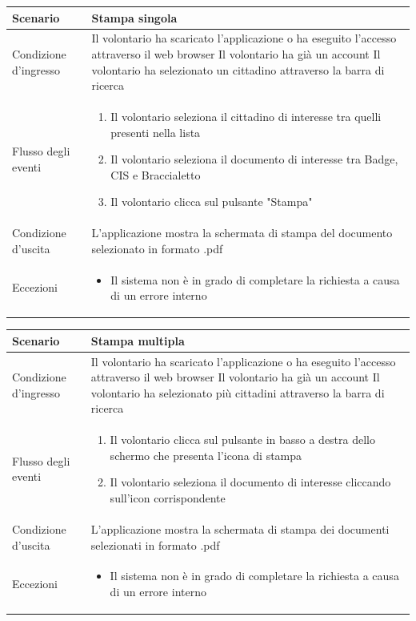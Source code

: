 \documentclass[12pt,a4paper,twoside,openright,titlepage]{book}
\begin{document}
\begin{table}[H]
\centering
\begin{tabular}{|p{4cm}|p{10cm}|}
\hline
Scenario & Stampa singola \\
\hline
Condizione d'ingresso & Il volontario ha scaricato l'applicazione o ha eseguito l'accesso attraverso il web browser \newline
Il volontario ha già un account\newline
Il volontario ha selezionato un cittadino attraverso la barra di ricerca \\
\hline
Flusso degli eventi & 
\begin{enumerate}
\item Il volontario seleziona il cittadino di interesse tra quelli presenti nella lista
\item Il volontario seleziona il documento di interesse tra Badge, CIS e Braccialetto
\item Il volontario clicca sul pulsante "Stampa"
\end{enumerate}\\
\hline
Condizione d'uscita & L'applicazione mostra la schermata di stampa del documento selezionato in formato .pdf\\
\hline
Eccezioni & 
\begin{itemize}
\item Il sistema non è in grado di completare la richiesta a causa di un errore interno
\end{itemize} \\
\hline
\end{tabular}
\end{table}

\begin{table}[H]
\centering
\begin{tabular}{|p{4cm}|p{10cm}|}
\hline
Scenario & Stampa multipla \\
\hline
Condizione d'ingresso & Il volontario ha scaricato l'applicazione o ha eseguito l'accesso attraverso il web browser \newline
Il volontario ha già un account\newline
Il volontario ha selezionato più cittadini attraverso la barra di ricerca \\
\hline
Flusso degli eventi & 
\begin{enumerate}
\item Il volontario clicca sul pulsante in basso a destra dello schermo che presenta l'icona di stampa
\item Il volontario seleziona il documento di interesse cliccando sull'icon corrispondente
\end{enumerate}\\
\hline
Condizione d'uscita & L'applicazione mostra la schermata di stampa dei documenti selezionati in formato .pdf\\
\hline
Eccezioni & 
\begin{itemize}
\item Il sistema non è in grado di completare la richiesta a causa di un errore interno
\end{itemize} \\
\hline
\end{tabular}
\end{table}
\end{document}
